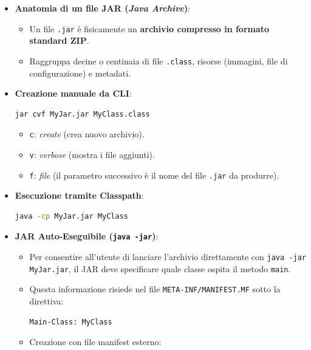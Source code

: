 \documentclass[11pt,a4paper]{article}
\newcommand{\passthrough}[1]{#1}
\providecommand{\tightlist}{\setlength{\itemsep}{0pt}\setlength{\parskip}{0pt}}
\begin{document}
\begin{itemize}
\item
  \textbf{Anatomia di un file JAR (\emph{Java Archive})}:

  \begin{itemize}
  \tightlist
  \item
    Un file \passthrough{\lstinline!.jar!} è fisicamente un
    \textbf{archivio compresso in formato standard ZIP}.
  \item
    Raggruppa decine o centinaia di file
    \passthrough{\lstinline!.class!}, risorse (immagini, file di
    configurazione) e metadati.
  \end{itemize}
\item
  \textbf{Creazione manuale da CLI}:

\begin{lstlisting}[language=bash]
jar cvf MyJar.jar MyClass.class
\end{lstlisting}

  \begin{itemize}
  \tightlist
  \item
    \passthrough{\lstinline!c!}: \emph{create} (crea nuovo archivio).
  \item
    \passthrough{\lstinline!v!}: \emph{verbose} (mostra i file
    aggiunti).
  \item
    \passthrough{\lstinline!f!}: \emph{file} (il parametro successivo è
    il nome del file \passthrough{\lstinline!.jar!} da produrre).
  \end{itemize}
\item
  \textbf{Esecuzione tramite Classpath}:

\begin{lstlisting}[language=bash]
java -cp MyJar.jar MyClass
\end{lstlisting}
\item
  \textbf{JAR Auto-Eseguibile (\passthrough{\lstinline!java -jar!})}:

  \begin{itemize}
  \item
    Per consentire all'utente di lanciare l'archivio direttamente con
    \passthrough{\lstinline!java -jar MyJar.jar!}, il JAR deve
    specificare quale classe ospita il metodo
    \passthrough{\lstinline!main!}.
  \item
    Questa informazione risiede nel file
    \passthrough{\lstinline!META-INF/MANIFEST.MF!} sotto la direttiva:

\begin{lstlisting}
Main-Class: MyClass
\end{lstlisting}
  \item
    Creazione con file manifest esterno:


\end{itemize}
\end{itemize}
\end{document}
